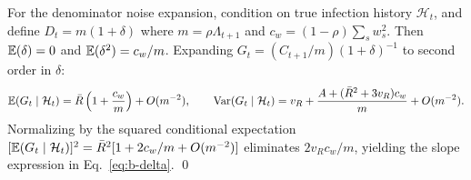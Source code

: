 For the denominator noise expansion, condition on true infection history $\mathcal{H}_t$, and define $D_t = m(1+\delta)$ where $m = \rho \Lambda_{t+1}$ and $c_w = (1-\rho)\sum_s w_s^2$. Then $\mathbb{E}(\delta) = 0$ and $\mathbb{E}(\delta^2) = c_w/m$. Expanding $G_t = (C_{t+1}/m)(1+\delta)^{-1}$ to second order in $\delta$:
\begin{equation}
  \mathbb{E}(G_t \mid \mathcal{H}_t) = \bar{R}\left(1 + \frac{c_w}{m}\right) + O(m^{-2}), \qquad
  \mathrm{Var}(G_t \mid \mathcal{H}_t) = v_R + \frac{A + (\bar{R}^2 + 3v_R)c_w}{m} + O(m^{-2}).
\end{equation}
Normalizing by the squared conditional expectation $[\mathbb{E}(G_t \mid \mathcal{H}_t)]^2 = \bar{R}^2[1 + 2c_w/m + O(m^{-2})]$ eliminates $2v_R c_w/m$, yielding the slope expression in Eq.~\eqref{eq:b-delta}. \qed
